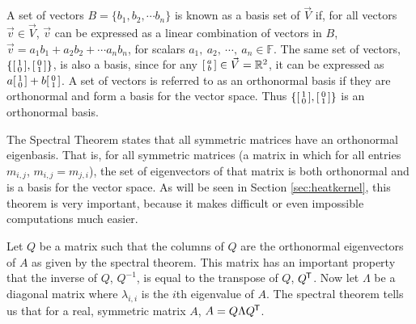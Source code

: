 A set of vectors \(B = \{b_{1}, b_{2}, \cdots b_{n}\}\) is known as a basis set of \(\vec{V}\) if, for all vectors \(\vec{v} \in \vec{V}\), \(\vec{v}\) can be expressed as a linear combination of vectors in \(B\), \(\vec{v} = a_{1}b_{1} + a_{2}b_{2} + \cdots a_{n}b_{n}\), for scalars \(a_{1},~a_{2},~\cdots,~a_{n} \in \mathbb{F}\). The same set of vectors, \(\left\{\begin{bsmallmatrix}
1 \\ 0
\end{bsmallmatrix}, \begin{bsmallmatrix}
0 \\ 1
\end{bsmallmatrix}\right\}\), is also a basis, since for any \(\begin{bsmallmatrix}
a \\ b
\end{bsmallmatrix} \in \vec{V} = \mathbb{R}^{2}\), it can be expressed as \(a\begin{bsmallmatrix}
1 \\ 0
\end{bsmallmatrix} + b\begin{bsmallmatrix}
0 \\ 1
\end{bsmallmatrix}\). A set of vectors is referred to as an orthonormal basis if they are orthonormal and form a basis for the vector space. Thus \(\left\{\begin{bsmallmatrix}
1 \\ 0
\end{bsmallmatrix}, \begin{bsmallmatrix}
0 \\ 1
\end{bsmallmatrix}\right\}\) is an orthonormal basis.

The Spectral Theorem states that all symmetric matrices have an orthonormal eigenbasis. That is, for all symmetric matrices (a matrix in which for all entries \(m_{i, j}\), \(m_{i, j} = m_{j, i}\)), the set of eigenvectors of that matrix is both orthonormal and is a basis for the vector space. As will be seen in Section \ref{sec:heatkernel}, this theorem is very important, because it makes difficult or even impossible computations much easier.

Let \(Q\) be a matrix such that the columns of \(Q\) are the orthonormal eigenvectors of \(A\) as given by the spectral theorem. This matrix has an important property that the inverse of \(Q\), \(Q^{-1}\), is equal to the transpose of \(Q\), \(Q^{\mkern-1.5mu\mathsf{T}}\). Now let \(\Lambda\) be a diagonal matrix where \(\lambda_{i, i}\) is the \(i\)th eigenvalue of \(A\). The spectral theorem tells us that for a real, symmetric matrix \(A\), \(A = Q\Lambda Q^{\mkern-1.5mu\mathsf{T}}\).

